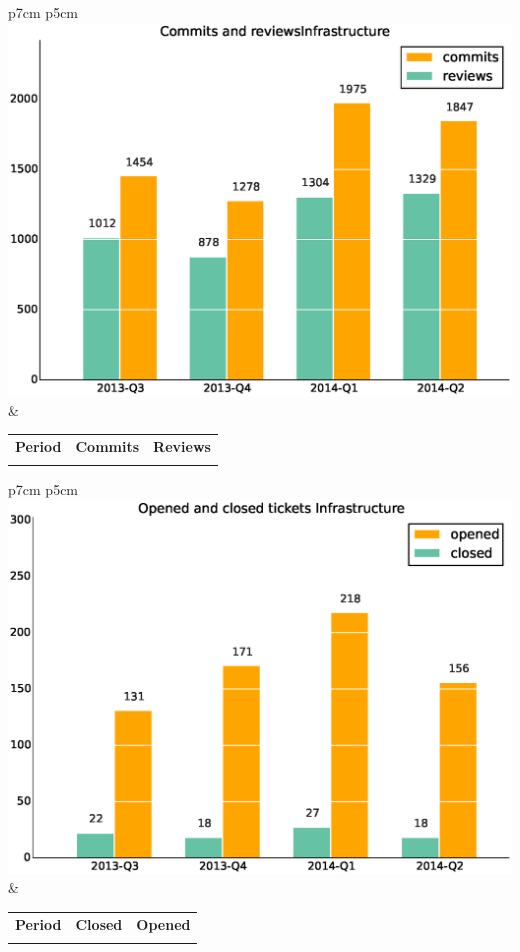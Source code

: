 \documentclass[a4wide,11pt]{report}
\begin{document}
\begin{tabular}{p{7cm} p{5cm}}
    \vspace{0pt} 
    \includegraphics[scale=.35]{figs/commitsInfrastructure.eps}
    & 
    \vspace{0pt}
    \begin{tabular}{l|r|r|}%
    \bfseries Period & \bfseries Commits & \bfseries Reviews %
    \csvreader[head to column names]{data/commitsInfrastructure.csv}{}%
    {\\ & \commits & \submitted}
    \end{tabular}
\end{tabular}

\begin{tabular}{p{7cm} p{5cm}}
    \vspace{0pt} 
    \includegraphics[scale=.35]{figs/closedInfrastructure.eps}
    & 
    \vspace{0pt}
    \begin{tabular}{l|r|r|}%
\bfseries Period & \bfseries Closed & \bfseries Opened
    \csvreader[head to column names]{data/closedInfrastructure.csv}{}%
    {\\ & \closed & \opened}
    \end{tabular}
\end{tabular}
\end{document}
